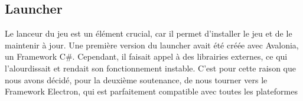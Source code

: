 \subsection{Launcher}

Le lanceur du jeu est un élément crucial, car il permet d'installer 
le jeu et de le maintenir à jour. Une première version du launcher avait 
été créée avec Avalonia, un Framework C#. Cependant, il faisait appel à des 
librairies externes, ce qui l'alourdissait et rendait son fonctionnement instable. 
C'est pour cette raison que nous avons décidé, pour la deuxième soutenance, de nous 
tourner vers le Framework Electron, qui est parfaitement compatible avec toutes les 
plateformes